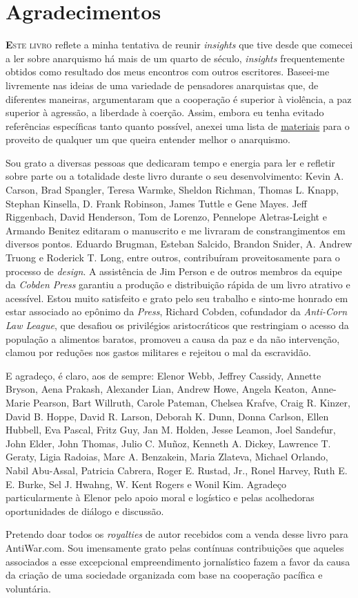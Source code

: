 
\chapter{Agradecimentos}

\lettrine[lines=2]{\textcolor{LettrineColor}{\textbf{E}}}{ste livro} reflete a minha tentativa de reunir \emph{insights} que tive desde que comecei a ler sobre anarquismo há mais de um quarto de século, \emph{insights} frequentemente obtidos como resultado dos meus encontros com outros escritores. Baseei-me livremente nas ideias de uma variedade de pensadores anarquistas que, de diferentes maneiras, argumentaram que a cooperação é superior à violência, a paz superior à agressão, a liberdade à coerção. Assim, embora eu tenha evitado referências específicas tanto quanto possível, anexei uma lista de \hyperref[chap:rec]{materiais} para o proveito de qualquer um que queira entender melhor o anarquismo.

Sou grato a diversas pessoas que dedicaram tempo e energia para ler e refletir sobre parte ou a totalidade deste livro durante o seu desenvolvimento: Kevin A. Carson, Brad Spangler, Teresa Warmke, Sheldon Richman, Thomas L. Knapp, Stephan Kinsella, D. Frank Robinson, James Tuttle e Gene Mayes. Jeff Riggenbach, David Henderson, Tom de Lorenzo, Pennelope Aletras-Leight e Armando Benitez editaram o manuscrito e me livraram de constrangimentos em diversos pontos. Eduardo Brugman, Esteban Salcido, Brandon Snider, A. Andrew Truong e Roderick T. Long, entre outros, contribuíram proveitosamente para o processo de \emph{design}. A assistência de Jim Person e de outros membros da equipe da \emph{Cobden Press} garantiu a produção e distribuição rápida de um livro atrativo e acessível. Estou muito satisfeito e grato pelo seu trabalho e sinto-me honrado em estar associado ao epônimo da \emph{Press}, Richard Cobden, cofundador da \emph{Anti-Corn Law League}, que desafiou os privilégios aristocráticos que restringiam o acesso da população a alimentos baratos, promoveu a causa da paz e da não intervenção, clamou por reduções nos gastos militares e rejeitou o mal da escravidão.

E agradeço, é claro, aos de sempre: Elenor Webb, Jeffrey Cassidy, Annette Bryson, Aena Prakash, Alexander Lian, Andrew Howe, Angela Keaton, Anne-Marie Pearson, Bart Willruth, Carole Pateman, Chelsea Krafve, Craig R. Kinzer, David B. Hoppe, David R. Larson, Deborah K. Dunn, Donna Carlson, Ellen Hubbell, Eva Pascal, Fritz Guy, Jan M. Holden, Jesse Leamon, Joel Sandefur, John Elder, John Thomas, Julio C. Muñoz, Kenneth A. Dickey, Lawrence T. Geraty, Ligia Radoias, Marc A. Benzakein, Maria Zlateva, Michael Orlando, Nabil Abu-Assal, Patricia Cabrera, Roger E. Rustad, Jr., Ronel Harvey, Ruth E. E. Burke, Sel J. Hwahng, W. Kent Rogers e Wonil Kim. Agradeço particularmente à Elenor pelo apoio moral e logístico e pelas acolhedoras oportunidades de diálogo e discussão.

Pretendo doar todos os \emph{royalties} de autor recebidos com a venda desse livro para AntiWar.com. Sou imensamente grato pelas contínuas contribuições que aqueles associados a esse excepcional empreendimento jornalístico fazem a favor da causa da criação de uma sociedade organizada com base na cooperação pacífica e voluntária.
